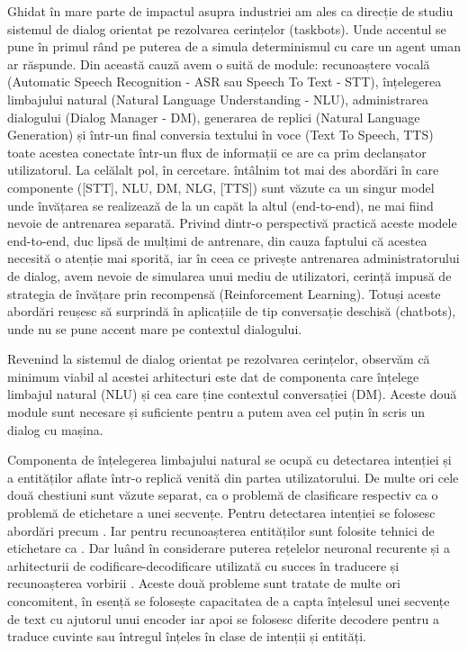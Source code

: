 Ghidat în mare parte de impactul asupra industriei am ales ca direcție de studiu sistemul de dialog orientat pe rezolvarea cerințelor (taskbots). Unde accentul se pune în primul rând pe puterea de a simula determinismul cu care un agent uman ar răspunde. Din această cauză avem o suită de module: recunoaștere vocală (Automatic Speech Recognition - ASR sau Speech To Text - STT), înțelegerea limbajului natural (Natural Language Understanding - NLU), administrarea dialogului (Dialog Manager - DM), generarea de replici (Natural Language Generation) și într-un final conversia textului în voce (Text To Speech, TTS) toate acestea conectate într-un flux de informații ce are ca prim declanșator utilizatorul. La celălalt pol, în cercetare. întâlnim tot mai des abordări în care componente ([STT], NLU, DM, NLG, [TTS]) sunt văzute ca un singur model unde învățarea se realizează de la un capăt la altul (end-to-end)\cite{end-to-end-goal-oriented}, ne mai fiind nevoie de antrenarea separată. Privind dintr-o perspectivă practică aceste modele end-to-end, duc lipsă de mulțimi de antrenare, din cauza faptului că acestea necesită o atenție mai sporită, iar în ceea ce privește antrenarea administratorului de dialog, avem nevoie de simularea unui mediu de utilizatori, cerință impusă de strategia de învățare prin recompensă (Reinforcement Learning). Totuși aceste abordări reușesc să surprindă în aplicațiile de tip conversație deschisă (chatbots), unde nu se pune accent mare pe contextul dialogului.

Revenind la sistemul de dialog orientat pe rezolvarea cerințelor, observăm că minimum viabil al acestei arhitecturi este dat de componenta care înțelege limbajul natural (NLU) și cea care ține contextul conversației (DM). Aceste două module sunt necesare și suficiente pentru a putem avea cel puțin în scris un dialog cu mașina. 

Componenta de înțelegerea limbajului natural se ocupă cu detectarea intenției și a entităților aflate într-o replică venită din partea utilizatorului. De multe ori cele două chestiuni sunt văzute separat, ca o problemă de clasificare respectiv ca o problemă de etichetare a unei secvențe.
Pentru detectarea intenției se folosesc abordări precum \cite{id_classifiers}. Iar pentru recunoașterea entităților sunt folosite tehnici de etichetare ca \cite{scipy_numpyeq_labeling}. Dar luând în considerare puterea rețelelor neuronal recurente și a arhitecturii de codificare-decodificare utilizată cu succes în traducere și recunoașterea vorbirii \cite{luoung_bahdanau_maning}. Aceste două probleme sunt tratate de multe ori concomitent, în esență se folosește capacitatea de a capta înțelesul unei secvențe de text cu ajutorul unui encoder iar apoi se folosesc diferite decodere pentru a traduce cuvinte sau întregul înțeles în clase de intenții și entități.

